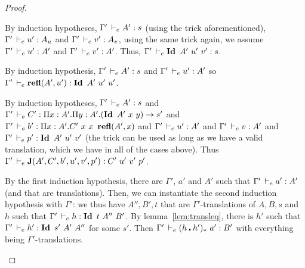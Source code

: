 \documentclass[a4paper,english]{lipics-utf8x}
\begin{document}
\begin{proof}
\begin{caselist}
      \begin{graycase}
        \begin{mathc}
        \end{mathc}
        By induction hypotheses, $\Gamma' \,\vdash_e A' : s$ (using the trick
        aforementioned), $\Gamma' \,\vdash_e u' : A_u$ and $\Gamma' \,\vdash_e v' : A_v$,
        using the same trick again, we assume $\Gamma' \,\vdash_e u' : A'$ and
        $\Gamma' \,\vdash_e v' : A'$.
        Thus, $\Gamma' \,\vdash_e \operatorname{\mathbf{Id}~} A'\ u'\ v' : s$.
      \end{graycase}

      \begin{graycase}
        \begin{mathc}
        \end{mathc}
        By induction hypothesis, $\Gamma' \,\vdash_e A' : s$ and
        $\Gamma' \,\vdash_e u' : A'$ so
        $\Gamma' \dere \refl(A',u') : \Id A'\ u'\ u'$.
      \end{graycase}

      \begin{graycase}
        \begin{mathc}
        \end{mathc}
        By induction hypotheses, $\Gamma' \,\vdash_e A' : s$ and
        $\Gamma' \,\vdash_e C' : \Pi x:A'. \Pi y:A'. (\operatorname{\mathbf{Id}~} A'\ x\ y) \to s'$ and
        $\Gamma' \dere b' : \Pi x:A'. C'\ x\ x\ \refl(A',x)$ and
        $\Gamma' \,\vdash_e u' : A'$ and $\Gamma' \,\vdash_e v : A'$ and
        $\Gamma' \,\vdash_e p' : \operatorname{\mathbf{Id}~} A'\ u'\ v'$ (the trick can be used as long as we
        have a valid translation, which we have in all of the cases above).
        Thus $\Gamma' \,\vdash_e \operatorname{\mathbf{J}}(A',C',b',u',v',p') : C'\ u'\ v'\ p'$.
      \end{graycase}

      \nextcase
      \begin{mathc}
      \end{mathc}
      By the first induction hypothesis, there are $\Gamma'$, $a'$ and $A'$
      such that $\Gamma' \,\vdash_e a' : A'$ (and that are translations).
      Then, we can instantiate the second induction hypothesis with $\Gamma'$:
      we thus have $A'',B',t$ that are $\Gamma'$-translations of $A,B,s$ and
      $h$ such that $\Gamma' \dere h : \Id t\ A''\ B'$.
      By lemma~\ref{lem:transleq}, there is $h'$ such that
      $\Gamma' \dere h' : \Id s'\ A'\ A''$ for some $s'$.
      Then $\Gamma' \,\vdash_e (h \centerdot h')_*\ a' : B'$ with everything being
      $\Gamma'$-translations.


\end{caselist}
\end{proof}
\end{document}
